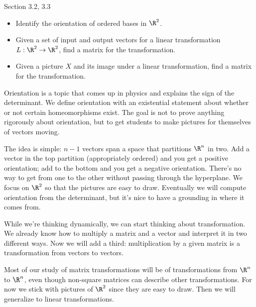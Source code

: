\begin{lesson}

	Section 3.2, 3.3

	\begin{itemize}
		\item Identify the orientation of ordered bases in $\R^2$.
		\item Given a set of input and output vectors for a
			linear transformation $L:\R^2\to\R^2$, find
			a matrix for the transformation.
		\item Given a picture $X$ and its image under a linear transformation,
			find a matrix for the transformation.
	\end{itemize}

	Orientation is a topic that comes up in physics and explains the sign
	of the determinant. We define orientation with an existential statement
	about whether or not certain homeomorphisms exist. The goal is not to
	prove anything rigorously about orientation, but to get students to
	make pictures for themselves of vectors moving.

	The idea is simple: $n-1$ vectors span a space that partitions $\R^n$ in
	two. Add a vector in the top partition (appropriately ordered) and you get
	a positive orientation; add to the bottom and you get a negative orientation.
	There's no way to get from one to the other without passing through the
	hyperplane. We focus on $\R^2$ so that the pictures are easy to draw.
	Eventually we will compute orientation from the determinant, but it's nice
	to have a grounding in where it comes from.

	While we're thinking dynamically, we can start thinking about transformation.
	We already know how to multiply a matrix and a vector and interpret it in
	two different ways. Now we will add a third: multiplication by a given
	matrix is a transformation from vectors to vectors.

	Most of our study of matrix transformations will be of transformations from $\R^n$
	to $\R^n$, even though non-square matrices can describe other transformations.
	For now we stick with pictures of $\R^2$ since they are easy to draw. Then
	we will generalize to linear transformations.

\end{lesson}

	\bookonlynewpage


